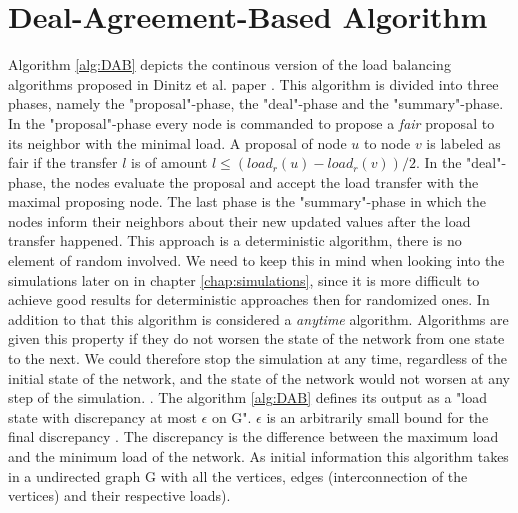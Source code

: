 \section{Deal-Agreement-Based Algorithm}
Algorithm \ref{alg:DAB} depicts the continous version of the load balancing algorithms proposed in Dinitz et al. paper \cite{dinitz2022localDealAgreementloadBalancing}. This algorithm is divided into three phases, namely the "proposal"-phase, the "deal"-phase and the "summary"-phase. In the "proposal"-phase every node is commanded to propose a \textit{fair} proposal to its neighbor with the minimal load. A proposal of node $u$ to node $v$ is labeled as fair if the transfer $l$ is of amount $l \leq (load_{r}(u)-load_{r}(v))/2$. In the "deal"-phase, the nodes evaluate the proposal and accept the load transfer with the maximal proposing node. The last phase is the "summary"-phase in which the nodes inform their neighbors about their new updated values after the load transfer happened. This approach is a deterministic algorithm, there is no element of random involved. We need to keep this in mind when looking into the simulations later on in chapter \ref{chap:simulations}, since it is more difficult to achieve good results for deterministic approaches then for randomized ones. In addition to that this algorithm is considered a \textit{anytime} algorithm. Algorithms are given this property if they do not worsen the state of the network from one state to the next. We could therefore stop the simulation at any time, regardless of the initial state of the network, and the state of the network would not worsen at any step of the simulation. . The algorithm \ref{alg:DAB} defines its output as a "load state with discrepancy at most $\epsilon$ on G". $\epsilon$ is an arbitrarily small bound for the final discrepancy \cite{dinitz2022localDealAgreementloadBalancing}. The discrepancy is the difference between the maximum load and the minimum load of the network. As initial information this algorithm takes in a undirected graph G with all the vertices, edges (interconnection of the vertices) and their respective loads).

